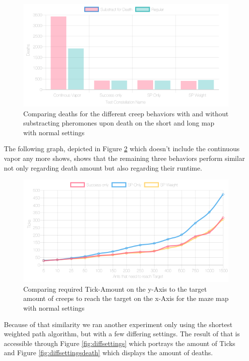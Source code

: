 \begin{figure}[H]
  \centering
  \includegraphics[width=1\linewidth]{images/normalshortandlongwithtowers-deaths}
  \caption{Comparing deaths for the different creep behaviors with and without substracting pheromones upon death on the short and long map with normal settings}
  \label{fig:deathsubshitty}
\end{figure}

The following graph, depicted in Figure \ref{fig:threesame} which doesn't include the continuous vapor any more shows, shows that the remaining three behaviors perform similar not only regarding death amount but also regarding their runtime.

\begin{figure}[H]
  \centering
  \includegraphics[width=1\linewidth]{images/normalsquaremaze-ticks-line}
  \caption{Comparing required Tick-Amount on the y-Axis to the target amount of creeps to reach the target on the x-Axis for the maze map with normal settings}
  \label{fig:threesame}
\end{figure}

Because of that similarity we ran another experiment only using the shortest weighted path algorithm, but with a few differing settings. The result of that is accessible through Figure \ref{fig:diffsettings} which portrays the amount of Ticks and Figure \ref{fig:diffsettingsdeath} which displays the amount of deaths.

